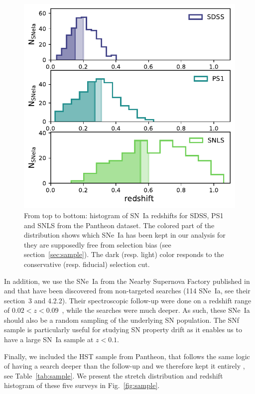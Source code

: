 \documentclass[]{aa} %
\newcommand{\nn}[1]{{\textcolor[rgb]{1, 0.27, 0}{#1}}}
\begin{document}
\begin{figure}
    \centering
    \includegraphics[width=0.95\linewidth]{Article_figures/hist_surveys_cuts_55.pdf}
    \caption{From top to bottom: histogram of SN~Ia redshifts for SDSS, PS1 and
    SNLS from the Pantheon dataset. The colored part of the
distribution shows which SNe~Ia has been kept in our analysis for they are
supposedly free from selection bias (see section~\ref{sec:sample}). The
dark (resp. light) color responds to the conservative (resp. fiducial) selection cut.}
    \label{fig:cuts}
\end{figure}

In addition, we use the SNe~Ia from the Nearby Supernova Factory
\citep[SNfactory][]{aldering2004} published in \cite{rigault2018} and that have
been discovered from non-targeted searches (114 SNe~Ia, see their section~3 and
4.2.2). \nn{Their spectroscopic follow-up were done on a redshift range of
$0.02<z<0.09$~\citep[as in ][]{rigault2018}, while the searches were much
deeper. As such, these SNe~Ia} should also be a random sampling of the underlying
SN population. The SNf sample is particularly useful for studying SN property
drift as it enables us to have a large SN~Ia sample at $z<0.1$.  

\nn{Finally, we included t}he HST sample
from Pantheon\nn{, that} follows the same logic of having a search deeper than the
follow-up and we therefore kept it entirely \citep{strolger04}, see
Table~\ref{tab:sample}. \nn{We present the stretch distribution and redshift histogram of these five surveys in Fig.~\ref{fig:sample}}.
\end{document}
